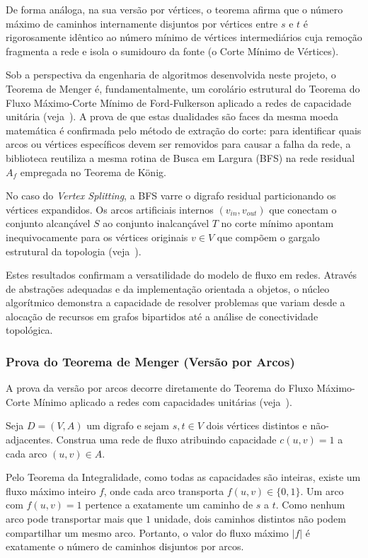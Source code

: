 \documentclass[12pt,a4paper]{article}
\begin{document}
De forma análoga, na sua versão por vértices, o teorema afirma que o número máximo de caminhos internamente disjuntos por vértices entre $s$ e $t$ é rigorosamente idêntico ao número mínimo de vértices intermediários cuja remoção fragmenta a rede e isola o sumidouro da fonte (o Corte Mínimo de Vértices).

Sob a perspectiva da engenharia de algoritmos desenvolvida neste projeto, o Teorema de Menger é, fundamentalmente, um corolário estrutural do Teorema do Fluxo Máximo-Corte Mínimo de Ford-Fulkerson aplicado a redes de capacidade unitária (veja~\cite{ahuja1993network}). A prova de que estas dualidades são faces da mesma moeda matemática é confirmada pelo método de extração do corte: para identificar quais arcos ou vértices específicos devem ser removidos para causar a falha da rede, a biblioteca reutiliza a mesma rotina de Busca em Largura (BFS) na rede residual $A_f$ empregada no Teorema de König.

No caso do \textit{Vertex Splitting}, a BFS varre o digrafo residual particionando os vértices expandidos. Os arcos artificiais internos $(v_{in}, v_{out})$ que conectam o conjunto alcançável $S$ ao conjunto inalcançável $T$ no corte mínimo apontam inequivocamente para os vértices originais $v \in V$ que compõem o gargalo estrutural da topologia (veja~\cite{korte2018combinatorial}).

Estes resultados confirmam a versatilidade do modelo de fluxo em redes. Através de abstrações adequadas e da implementação orientada a objetos, o núcleo algorítmico demonstra a capacidade de resolver problemas que variam desde a alocação de recursos em grafos bipartidos até a análise de conectividade topológica.

\subsubsection{Prova do Teorema de Menger (Versão por Arcos)}

A prova da versão por arcos decorre diretamente do Teorema do Fluxo Máximo-Corte Mínimo aplicado a redes com capacidades unitárias (veja~\cite{ahuja1993network, cook1998combinatorial}).

Seja $D = (V, A)$ um digrafo e sejam $s, t \in V$ dois vértices distintos e não-adjacentes. Construa uma rede de fluxo atribuindo capacidade $c(u,v) = 1$ a cada arco $(u,v) \in A$.

Pelo Teorema da Integralidade, como todas as capacidades são inteiras, existe um fluxo máximo inteiro $f$, onde cada arco transporta $f(u,v) \in \{0, 1\}$. Um arco com $f(u,v) = 1$ pertence a exatamente um caminho de $s$ a $t$. Como nenhum arco pode transportar mais que $1$ unidade, dois caminhos distintos não podem compartilhar um mesmo arco. Portanto, o valor do fluxo máximo $|f|$ é exatamente o número de caminhos disjuntos por arcos.
\end{document}
